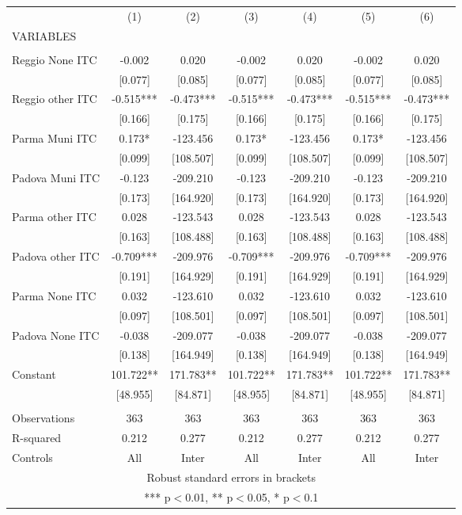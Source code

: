 \begin{tabular}{lcccccc} \hline
 & (1) & (2) & (3) & (4) & (5) & (6) \\
VARIABLES &  &  &  &  &  &  \\ \hline
 &  &  &  &  &  &  \\
Reggio None ITC & -0.002 & 0.020 & -0.002 & 0.020 & -0.002 & 0.020 \\
 & [0.077] & [0.085] & [0.077] & [0.085] & [0.077] & [0.085] \\
Reggio other ITC & -0.515*** & -0.473*** & -0.515*** & -0.473*** & -0.515*** & -0.473*** \\
 & [0.166] & [0.175] & [0.166] & [0.175] & [0.166] & [0.175] \\
Parma Muni ITC & 0.173* & -123.456 & 0.173* & -123.456 & 0.173* & -123.456 \\
 & [0.099] & [108.507] & [0.099] & [108.507] & [0.099] & [108.507] \\
Padova Muni ITC & -0.123 & -209.210 & -0.123 & -209.210 & -0.123 & -209.210 \\
 & [0.173] & [164.920] & [0.173] & [164.920] & [0.173] & [164.920] \\
Parma other ITC & 0.028 & -123.543 & 0.028 & -123.543 & 0.028 & -123.543 \\
 & [0.163] & [108.488] & [0.163] & [108.488] & [0.163] & [108.488] \\
Padova other ITC & -0.709*** & -209.976 & -0.709*** & -209.976 & -0.709*** & -209.976 \\
 & [0.191] & [164.929] & [0.191] & [164.929] & [0.191] & [164.929] \\
Parma None ITC & 0.032 & -123.610 & 0.032 & -123.610 & 0.032 & -123.610 \\
 & [0.097] & [108.501] & [0.097] & [108.501] & [0.097] & [108.501] \\
Padova None ITC & -0.038 & -209.077 & -0.038 & -209.077 & -0.038 & -209.077 \\
 & [0.138] & [164.949] & [0.138] & [164.949] & [0.138] & [164.949] \\
Constant & 101.722** & 171.783** & 101.722** & 171.783** & 101.722** & 171.783** \\
 & [48.955] & [84.871] & [48.955] & [84.871] & [48.955] & [84.871] \\
 &  &  &  &  &  &  \\
Observations & 363 & 363 & 363 & 363 & 363 & 363 \\
R-squared & 0.212 & 0.277 & 0.212 & 0.277 & 0.212 & 0.277 \\
 Controls & All & Inter & All & Inter & All & Inter \\ \hline
\multicolumn{7}{c}{ Robust standard errors in brackets} \\
\multicolumn{7}{c}{ *** p$<$0.01, ** p$<$0.05, * p$<$0.1} \\
\end{tabular}
